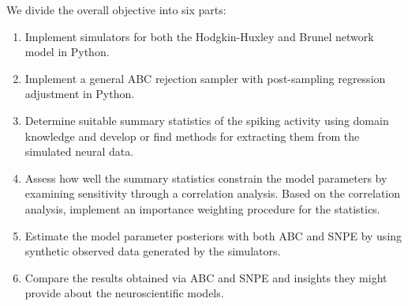 We divide the overall objective into six parts:
\begin{enumerate}
    \item Implement simulators for both the Hodgkin-Huxley and Brunel network model in Python. 
    \item Implement a general ABC rejection sampler with post-sampling regression adjustment in Python.
    \item Determine suitable summary statistics of the spiking activity using domain knowledge and develop or find methods for extracting them from the simulated neural data. 
    \item Assess how well the summary statistics constrain the model parameters by examining sensitivity through a correlation analysis. Based on the correlation analysis, implement an importance weighting procedure for the statistics. 
    \item Estimate the model parameter posteriors with both ABC and SNPE by using synthetic observed data generated by the simulators. 
    \item Compare the results obtained via ABC and SNPE and insights they might provide about the neuroscientific models. 
\end{enumerate}



